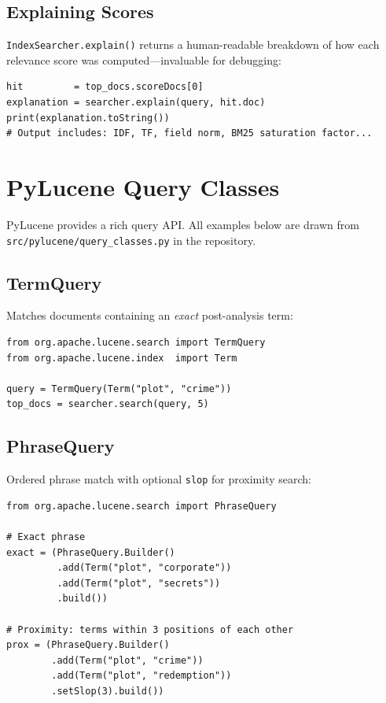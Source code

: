 \documentclass[11pt,a4paper]{article}
\begin{document}
\subsection{Explaining Scores}

\texttt{IndexSearcher.explain()} returns a human-readable breakdown of how each
relevance score was computed—invaluable for debugging:

\begin{lstlisting}[caption={Score explanation}]
hit         = top_docs.scoreDocs[0]
explanation = searcher.explain(query, hit.doc)
print(explanation.toString())
# Output includes: IDF, TF, field norm, BM25 saturation factor...
\end{lstlisting}

\section{PyLucene Query Classes}

PyLucene provides a rich query API. All examples below are drawn from \\
\texttt{src/pylucene/query\_classes.py} in the repository.

\subsection{TermQuery}

Matches documents containing an \emph{exact} post-analysis term:

\begin{lstlisting}[caption={TermQuery -- exact single-term match}]
from org.apache.lucene.search import TermQuery
from org.apache.lucene.index  import Term

query = TermQuery(Term("plot", "crime"))
top_docs = searcher.search(query, 5)
\end{lstlisting}

\subsection{PhraseQuery}

Ordered phrase match with optional \texttt{slop} for proximity search:

\begin{lstlisting}[caption={PhraseQuery -- exact phrase and proximity}]
from org.apache.lucene.search import PhraseQuery

# Exact phrase
exact = (PhraseQuery.Builder()
         .add(Term("plot", "corporate"))
         .add(Term("plot", "secrets"))
         .build())

# Proximity: terms within 3 positions of each other
prox = (PhraseQuery.Builder()
        .add(Term("plot", "crime"))
        .add(Term("plot", "redemption"))
        .setSlop(3).build())
\end{lstlisting}
\end{document}
